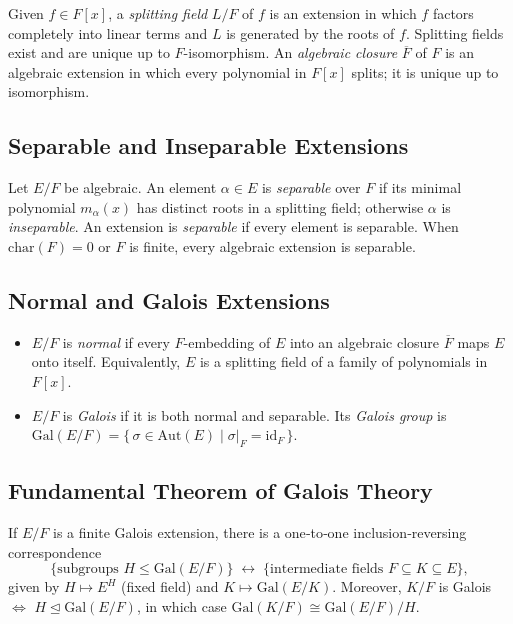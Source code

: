 Given \(f\in F[x]\), a \emph{splitting field} \(L/F\) of \(f\) is an extension in which \(f\) factors completely into linear terms and \(L\) is generated by the roots of \(f\).  
Splitting fields exist and are unique up to \(F\)-isomorphism.  
An \emph{algebraic closure} \(\overline{F}\) of \(F\) is an algebraic extension in which every polynomial in \(F[x]\) splits; it is unique up to isomorphism.

\subsection{Separable and Inseparable Extensions}

Let \(E/F\) be algebraic.  An element \(\alpha\in E\) is \emph{separable} over \(F\) if its minimal polynomial \(m_\alpha(x)\) has distinct roots in a splitting field; otherwise \(\alpha\) is \emph{inseparable}.  
An extension is \emph{separable} if every element is separable.  
When \(\mathrm{char}(F)=0\) or \(F\) is finite, every algebraic extension is separable.

\subsection{Normal and Galois Extensions}

\begin{itemize}
    \item \(E/F\) is \emph{normal} if every \(F\)-embedding of \(E\) into an algebraic closure \(\overline{F}\) maps \(E\) onto itself.  Equivalently, \(E\) is a splitting field of a family of polynomials in \(F[x]\).
    \item \(E/F\) is \emph{Galois} if it is both normal and separable.  
          Its \emph{Galois group} is \(\mathrm{Gal}(E/F)=\{\,\sigma\in\mathrm{Aut}(E)\mid \sigma|_F=\mathrm{id}_F\,\}\).
\end{itemize}

\subsection{Fundamental Theorem of Galois Theory}

If \(E/F\) is a finite Galois extension, there is a one‑to‑one inclusion‑reversing correspondence
\[
\bigl\{\text{subgroups } H\le \mathrm{Gal}(E/F)\bigr\}
\;\longleftrightarrow\;
\bigl\{\text{intermediate fields } F\subseteq K\subseteq E\bigr\},
\]
given by \(H\mapsto E^{H}\) (fixed field) and \(K\mapsto \mathrm{Gal}(E/K)\).
Moreover, \(K/F\) is Galois \(\iff\) \(H\!\unlhd\!\mathrm{Gal}(E/F)\), in which case
\(\mathrm{Gal}(K/F)\cong \mathrm{Gal}(E/F)\!/H\).

